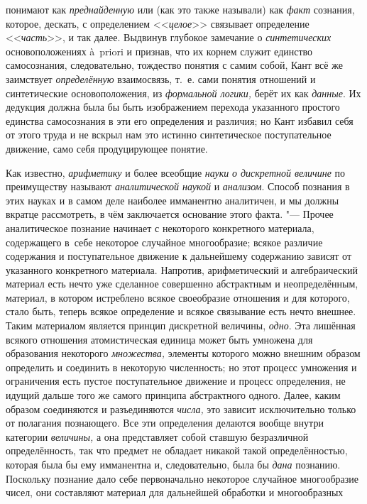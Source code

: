 понимают как {\em преднайденную}
или (как это также называли) как
{\em факт} сознания,
которое, дескать, с определением
<<{\em целое}>> связывает
определение <<{\em часть}>>,
и так далее. Выдвинув глубокое замечание о
{\em синтетических}
основоположениях à~priori и признав, что их корнем служит
единство самосознания, следовательно, тождество понятия с самим собой, Кант
всё же заимствует {\em определённую}
взаимосвязь, т.~е. сами понятия отношений и синтетические
основоположения, из {\em формальной
логики,} берёт их как
{\em данные}. Их дедукция
должна была бы быть изображением перехода указанного простого единства
самосознания в эти его определения и различия; но Кант избавил себя от
этого труда и не вскрыл нам это истинно синтетическое поступательное
движение, само себя продуцирующее понятие.

Как известно,
{\em арифметику} и более
всеобщие {\em науки}
{\em о дискретной величине}
по преимуществу называют
{\em аналитической наукой}
и {\em анализом}.
Способ познания в этих науках и в самом деле наиболее
имманентно аналитичен, и мы должны вкратце рассмотреть, в чём заключается
основание этого факта. "--- Прочее аналитическое познание
начинает с некоторого конкретного материала, содержащего в~себе некоторое
случайное многообразие; всякое различие содержания и поступательное
движение к дальнейшему содержанию зависят от указанного конкретного
материала. Напротив, арифметический и алгебраический материал есть нечто
уже сделанное совершенно абстрактным и неопределённым, материал, в котором
истреблено всякое своеобразие отношения и для которого, стало быть, теперь
всякое определение и всякое связывание есть нечто внешнее. Таким
материалом является принцип дискретной величины,
{\em одно}. Эта лишённая
всякого отношения атомистическая единица может быть умножена для
образования некоторого {\em множества,}
элементы которого можно внешним образом определить и
соединить в некоторую численность; но этот процесс умножения и ограничения
есть пустое поступательное движение и процесс определения, не идущий дальше
того же самого принципа абстрактного одного. Далее, каким образом
соединяются и разъединяются
{\em числа,} это зависит
исключительно только от полагания познающего. Все эти определения делаются
вообще внутри категории {\em величины,}
а она представляет собой ставшую безразличной определённость,
так что предмет не обладает никакой такой определённостью, которая была бы
ему имманентна и, следовательно, была бы
{\em дана} познанию.
Поскольку познание дало себе первоначально некоторое случайное многообразие
чисел, они составляют материал для дальнейшей обработки и многообразных
